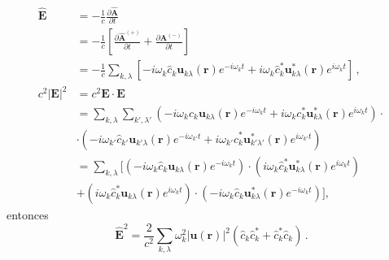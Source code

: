 \begin{align*}
  \hat{\mathbf{E}}           & = -\frac{1}{c} \frac{\partial \hat{\mathbf{A}}}{\partial t}                                                                                                                                                         \\
                             & =-\frac{1}{c}\left[ \frac{\partial \hat{\mathbf{A}}^{(+)}}{\partial t} + \frac{\partial \mathbf{A}^{(-)}}{\partial t} \right]                                                                                       \\
                             & = -\frac{1}{c} \sum_{k,\lambda} \left[ -i\omega_{k}\hat{c}_{k} \mathbf{u}_{k\lambda} (\mathbf{r})e^{-i\omega_k t} +  i\omega_{k}\hat{c}_{k}^* \mathbf{u}_{k\lambda}^* (\mathbf{r})e^{i\omega_{k} t} \right] \,,     \\
  c^2 \vert\mathbf{E}\vert^2 & = c^2 \mathbf{E} \cdot \mathbf{E}                                                                                                                                                                                   \\
                             & = \sum_{k,\lambda}\sum_{k',\lambda'}\left(-i\omega_{k}\hat{c}_{k}\mathbf{u}_{k\lambda} (\mathbf{r})e^{-i\omega_{k}t} + i \omega_{k} c^{*}_{k}\mathbf{u}^{*}_{k\lambda}(\mathbf{r})e^{i\omega_{k}t} \right)\cdot     \\
                             & \cdot \left(-i\omega_{k'}\hat{c}_{k'}\mathbf{u}_{k'\lambda} (\mathbf{r})e^{-i\omega_{k'}t} + i \omega_{k'} \hat{c}^{*}_{k}\mathbf{u}^{*}_{k'\lambda'}(\mathbf{r})e^{i\omega_{k'}t} \right)                          \\
                             & = \sum_{k,\lambda} \Big[ \left(-i\omega_{k}\hat{c}_{k} \mathbf{u}_{k\lambda} (\mathbf{r})e^{-i\omega_k t}\right)\cdot \left( i\omega_{k}\hat{c}_{k}^* \mathbf{u}_{k\lambda}^* (\mathbf{r})e^{i\omega_{k} t} \right) \\
                             & +  \left(i\omega_{k}\hat{c}_{k}^* \mathbf{u}_{k\lambda} (\mathbf{r})e^{i\omega_{k} t}\right)\cdot \left(-i\omega_{k}\hat{c}_{k} \mathbf{u}_{k\lambda}^* (\mathbf{r})e^{-i\omega_k t}\right) \Big],
\end{align*}
entonces
\begin{equation}
  \label{EM.18}
  \hat{\mathbf{E}}^2 = \frac{2}{c^2}\sum_{k,\lambda} \omega_{k}^2  |\mathbf{u}(\mathbf{r})|^2 \left( \hat{c}_{k} \hat{c}_{k}^* + \hat{c}_{k}^* \hat{c}_{k} \right) \,.
\end{equation}
